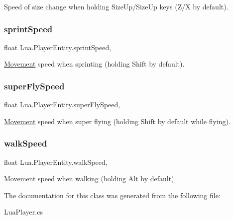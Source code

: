 Speed of size change when holding {\ttfamily Size\+Up}/{\ttfamily Size\+Up} keys ({\ttfamily Z}/{\ttfamily X} by default). 

\mbox{\label{class_lua_1_1_player_entity_acd890123e850bbd3c1e4e459b65ea5c1}} 
\subsubsection{\texorpdfstring{sprintSpeed}{sprintSpeed}}
{\footnotesize\ttfamily float Lua.\+Player\+Entity.\+sprint\+Speed\hspace{0.3cm}{\ttfamily [get]}, {\ttfamily [set]}}



\mbox{\hyperlink{class_lua_1_1_movement}{Movement}} speed when sprinting (holding {\ttfamily Shift} by default). 

\mbox{\label{class_lua_1_1_player_entity_aee7c81573cc1de31d9f64fd13b534ae2}} 
\subsubsection{\texorpdfstring{superFlySpeed}{superFlySpeed}}
{\footnotesize\ttfamily float Lua.\+Player\+Entity.\+super\+Fly\+Speed\hspace{0.3cm}{\ttfamily [get]}, {\ttfamily [set]}}



\mbox{\hyperlink{class_lua_1_1_movement}{Movement}} speed when super flying (holding {\ttfamily Shift} by default while flying). 

\mbox{\label{class_lua_1_1_player_entity_aabbfb4d83476aaa301ee4f526dd6ecf8}} 
\subsubsection{\texorpdfstring{walkSpeed}{walkSpeed}}
{\footnotesize\ttfamily float Lua.\+Player\+Entity.\+walk\+Speed\hspace{0.3cm}{\ttfamily [get]}, {\ttfamily [set]}}



\mbox{\hyperlink{class_lua_1_1_movement}{Movement}} speed when walking (holding {\ttfamily Alt} by default). 



The documentation for this class was generated from the following file\+:\begin{DoxyCompactItemize}
\item 
Lua\+Player.\+cs\end{DoxyCompactItemize}

